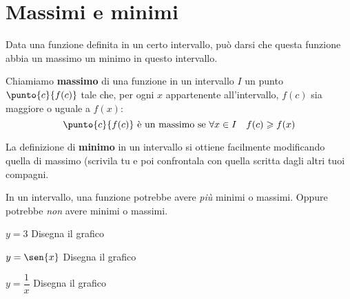 \begin{comment}
\end{esempio}

\begin{teorema}[Funzioni di funzioni]
Se \(f(x)\) e \(g(x)\) sono funzioni continue, anche \(f(g(x))\) è continua.
\end{teorema}

\noindent Ipotesi: 
\(f(x) \text{ e} g(x)\) sono continue
\tab Tesi: 
\(f(x) \star g(x) = f(g(x))\) è continua.

\begin{proof}
Dato che \(g\) è continua: 
\[f(g(x+\epsilon)) = f(g(x)+\alpha)\]
e dato che \(f\) è continua: 
\[f(g(x)+\alpha)=f(g(x))+\beta\]
quindi: 
\[f(g(x+\epsilon)) = f(g(x)+\alpha) = f(g(x))+\beta \approx f(g(x))\]
\end{proof}

\end{comment}

\section{Massimi e minimi}
\label{sec:cont_massimiminimi}

Data una funzione definita in un certo intervallo, può darsi che questa 
funzione abbia un massimo  un minimo in questo intervallo.

\begin{definizione}
 Chiamiamo \textbf{massimo} di una funzione in un intervallo \(I\) un punto 
\(\punto{c}{f(c)}\) tale che, per ogni \(x\) appartenente all'intervallo, 
\(f(c)\) sia maggiore o uguale a \(f(x)\):
\[\punto{c}{f(c)} \text{ è un massimo se } \forall x \in I \quad
f(c) \geqslant f(x)\]
\end{definizione}

La definizione di \textbf{minimo} in un intervallo si ottiene facilmente 
modificando quella di massimo (scrivila tu e poi confrontala con quella scritta 
dagli altri tuoi compagni.

In un intervallo, una funzione potrebbe avere \emph{più} minimi o massimi. 
Oppure potrebbe \emph{non} avere minimi o massimi.

\begin{esempio}
 \(y=3\) Disegna il grafico
\end{esempio}

\begin{esempio}
 \(y=\sen{x}\) Disegna il grafico
\end{esempio}

\begin{esempio}
 \(y=\dfrac{1}{x}\) Disegna il grafico
\end{esempio}

